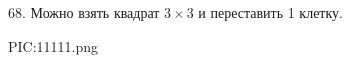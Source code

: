 68. Можно взять квадрат $3\times3$ и переставить 1 клетку.
\begin{center}
{{PIC:11111.png}}
\end{center}
